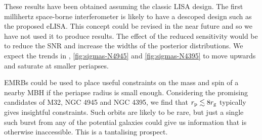 These results have been obtained assuming the classic LISA design. The first millihertz space-borne interferometer is likely to have a descoped design such as the proposed eLISA. This concept could be revised in the near future and so we have not used it to produce results. The effect of the reduced sensitivity would be to reduce the SNR and increase the widths of the posterior distributions. We expect the trends in , \ref{fig:sigmas-N4945} and \ref{fig:sigmas-N4395} to move upwards and saturate at smaller periapses.

EMRBs could be used to place useful constraints on the mass and spin of a nearby MBH if the periapse radius is small enough. Considering the promising candidates of M32, NGC 4945 and NGC 4395, we find that $r_\mathrm{p} \lesssim 8 r_\mathrm{g}$ typically gives insightful constraints. Such orbits are likely to be rare, but just a single such burst from any of the potential galaxies could give us information that is otherwise inaccessible. This is a tantalising prospect.
